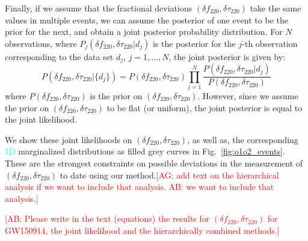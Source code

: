 \documentclass[twocolumn,prd,aps,superscriptaddress,preprintnumbers,tightenlines,showpacs,nofootinbib,eqsecnum,amsfonts,amsmath]{revtex4-1}
\newcommand{\ab}[1]{\textcolor{cyan}{#1}}
\newcommand{\comment}[1]{\textcolor{red}{[#1]}}
\newcommand{\df}[1]{\delta f_{\text{#1}}}
\newcommand{\dtau}[1]{\delta \tau_{\text{#1}}}
\begin{document}
Finally, if we assume that the fractional deviations $(\df{220},
\dtau{220})$ take the same values in multiple events, we can assume
the posterior of one event to be the prior for the next, and obtain a
joint posterior probability distribution. For $N$ observations, where
$P_j(\df{220}, \dtau{220} | d_j)$ is the posterior for the $j$-th
observation corresponding to the data set $d_j$, $j=1,\dots,N$, the joint
posterior is given by:
%
\begin{equation}
P(\df{220}, \dtau{220} | \{d_j\}) = P(\df{220}, \dtau{220}) \prod _{j=1}^N \frac{P(\df{220}, \dtau{220} | d_j) }{P(\df{220}, \dtau{220})}
\end{equation}
%
where $P(\df{220}, \dtau{220})$ is the prior on $(\df{220},
\dtau{220})$. However, since we assume the prior on $(\df{220},
\dtau{220})$ to be flat (or uniform), the joint posterior is equal to
the joint likelihood.

We show these joint likelihoods on $(\df{220}, \dtau{220})$, as well as, the corresponding \ab{1D} marginalized distributions as filled grey curves in Fig.~\ref{fig:o1o2_events}. 
These are the strongest constraints on possible deviations in the measurement of $(\df{220}, \dtau{220})$ to date using our method.\comment{AG: add text on the hierarchical analysis 
if we want to include that analysis. AB: we want to include that analysis.}

\comment{AB: Please write in the text (equations) the results for $(\df{220}, \dtau{220})$ for GW150914, the joint likelihood and the 
hierarchically combined methods.}
\end{document}
